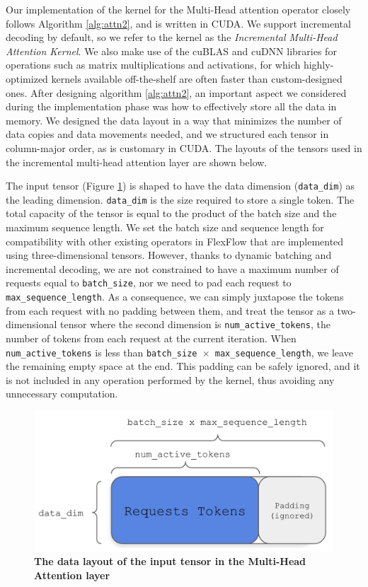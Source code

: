 Our implementation of the kernel for the Multi-Head attention operator closely follows Algorithm \ref{alg:attn2}, and is written in CUDA. We support incremental decoding by default, so we refer to the kernel as the \textit{Incremental Multi-Head Attention Kernel}. We also make use of the cuBLAS and cuDNN libraries for operations such as matrix multiplications and activations, for which highly-optimized kernels available off-the-shelf are often faster than custom-designed ones. After designing algorithm \ref{alg:attn2}, an important aspect we considered during the implementation phase was how to effectively store all the data in memory. We designed the data layout in a way that minimizes the number of data copies and data movements needed, and we structured each tensor in column-major order, as is customary in CUDA. The layouts of the tensors used in the incremental multi-head attention layer are shown below.

The input tensor (Figure \ref{fig:mha-input}) is shaped to have the data dimension (\texttt{data\_dim}) as the leading dimension. \texttt{data\_dim} is the size required to store a single token. The total capacity of the tensor is equal to the product of the batch size and the maximum sequence length. We set the batch size and sequence length for compatibility with other existing operators in FlexFlow that are implemented using three-dimensional tensors. However, thanks to dynamic batching and incremental decoding, we are not constrained to have a maximum number of requests equal to \texttt{batch\_size}, nor we need to pad each request to \texttt{max\_sequence\_length}. As a consequence, we can simply juxtapose the tokens from each request with no padding between them, and treat the tensor as a two-dimensional tensor where the second dimension is \texttt{num\_active\_tokens}, the number of tokens from each request at the current iteration. When \texttt{num\_active\_tokens} is less than \texttt{batch\_size $\times$ max\_sequence\_length}, we leave the remaining empty space at the end. This padding can be safely ignored, and it is not included in any operation performed by the kernel, thus avoiding any unnecessary computation.

\begin{figure}[H]
    \centering
    \includegraphics[width=0.6\linewidth]{figures/input_tensor2.png}
    \caption{\textbf{The data layout of the input tensor in the Multi-Head Attention layer}}
    \label{fig:mha-input}
\end{figure}

